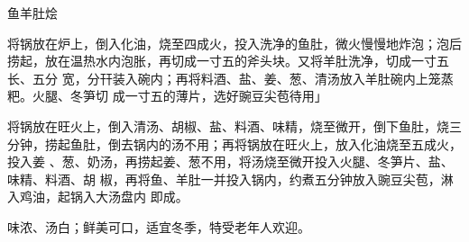 \begin{recipe}{鱼羊肚烩}

\ingredients


\cooking

\step 将锅放在炉上，倒入化油，烧至四成火，投入洗净的鱼肚，微火慢慢地炸泡；泡后
捞起，放在温热水内泡胀，再切成一寸五的斧头块。又将羊肚洗净，切成一寸五长、五分
宽，分幵装入碗内；再将料酒、盐、姜、葱、清汤放入羊肚碗内上笼蒸粑。火腿、冬笋切
成一寸五的薄片，选好豌豆尖苞待用」

\step 将锅放在旺火上，倒入清汤、胡椒、盐、料酒、味精，烧至微开，倒下鱼肚，烧三
分钟，捞起鱼肚，倒去锅内的汤不用；再将锅放在旺火上，放入化油烧至五成火，投入姜
、葱、奶汤，再捞起姜、葱不用，将汤烧至微开投入火腿、冬笋片、盐、味精、料酒、胡
椒，再将鱼、羊肚一并投入锅内，约煮五分钟放入豌豆尖苞，淋入鸡油，起锅入大汤盘内
即成。

\features

味浓、汤白；鲜美可口，适宜冬季，特受老年人欢迎。

\end{recipe}

